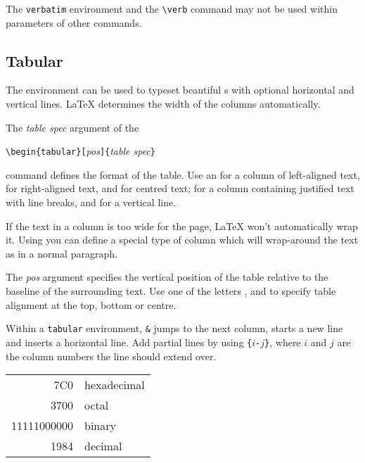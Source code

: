 The \texttt{verbatim} environment and the \verb|\verb| command may not be used
within parameters of other commands.


\subsection{Tabular}

\newcommand{\mfr}[1]{\framebox{\rule{0pt}{0.7em}\texttt{#1}}}

The  environment can be used to typeset beautiful
s with optional horizontal and vertical lines. \LaTeX{}
determines the width of the columns automatically.

The \emph{table spec} argument of the
\begin{lscommand}
\verb|\begin{tabular}[|\emph{pos}\verb|]{|\emph{table spec}\verb|}|
\end{lscommand}
\noindent command defines the format of the table. Use an \mfr{l} for a column of
left-aligned text, \mfr{r} for right-aligned text, and \mfr{c} for
centred text; \mfr{p\{\emph{width}\}} for a column containing justified
text with line breaks, and \mfr{|} for a vertical line.

If the text in a column is too wide for the page, \LaTeX{} won't
automatically wrap it. Using \mfr{p\{\emph{width}\}} you can define
a special type of column which will wrap-around the text as in a normal paragraph.

The \emph{pos} argument specifies the vertical position of the table
relative to the baseline of the surrounding text.  Use one of the
letters \mfr{t}, \mfr{b} and \mfr{c} to specify table
alignment at the top, bottom or centre.

Within a \texttt{tabular} environment, \texttt{\&} jumps to the next
column, \ci{\bs} starts a new line and  inserts a horizontal
line.  Add partial lines by using \texttt{\{}$i$\texttt{-}$j$\texttt{\}},
where $i$ and $j$ are the column numbers the line should extend over.


\begin{example}
\begin{tabular}{|r|l|}
\hline
7C0 & hexadecimal \\
3700 & octal \\ \cline{2-2}
11111000000 & binary \\
\hline \hline
1984 & decimal \\
\hline
\end{tabular}
\end{example}

